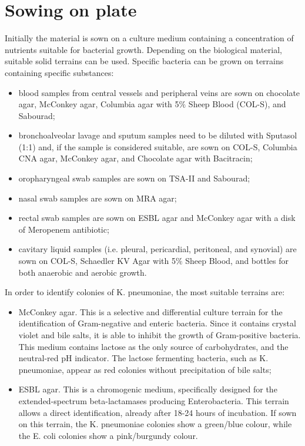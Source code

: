 \documentclass[11pt]{report}
\begin{document}
\section{Sowing on plate}
Initially the material is sown on a culture medium containing a concentration of nutrients suitable for bacterial growth.
Depending on the biological material, suitable solid terrains can be used. 
Specific bacteria can be grown on terrains containing specific substances:
\begin{itemize}
\item blood samples from central vessels and peripheral veins are sown on chocolate agar, McConkey agar, Columbia agar with 5$\%$ Sheep Blood (COL-S), and Sabourad;
\item bronchoalveolar lavage and sputum samples need to be diluted with Sputasol (1:1) and, if the sample is considered suitable, are sown on COL-S, Columbia CNA agar, McConkey agar, and Chocolate agar with Bacitracin;
\item oropharyngeal swab samples are sown on TSA-II and Sabourad;
\item nasal swab samples are sown on MRA agar;
\item rectal swab samples are sown on ESBL agar and McConkey agar with a disk of Meropenem antibiotic;
\item cavitary liquid samples (i.e. pleural, pericardial, peritoneal, and synovial) are sown on COL-S, Schaedler KV Agar with 5$\%$ Sheep Blood, and bottles for both anaerobic and aerobic growth.
\end{itemize}

In order to identify colonies of K. pneumoniae, the most suitable terrains are:
\begin{itemize}
\item McConkey agar.
This is a selective and differential culture terrain for the identification of Gram-negative and enteric bacteria.
Since it contains crystal violet and bile salts, it is able to inhibit the growth of Gram-positive bacteria. 
This medium contains lactose as the only source of carbohydrates, and the neutral-red pH indicator.
The lactose fermenting bacteria, such as K. pneumoniae, appear as red colonies without precipitation of bile salts;
\item ESBL agar.
This is a chromogenic medium, specifically designed for the extended-spectrum beta-lactamases producing Enterobacteria. This terrain allows a direct identification, already after 18-24 hours of incubation.
If sown on this terrain, the K. pneumoniae colonies show a green/blue colour, while the E. coli colonies show a pink/burgundy colour.
\end{itemize}
\end{document}
